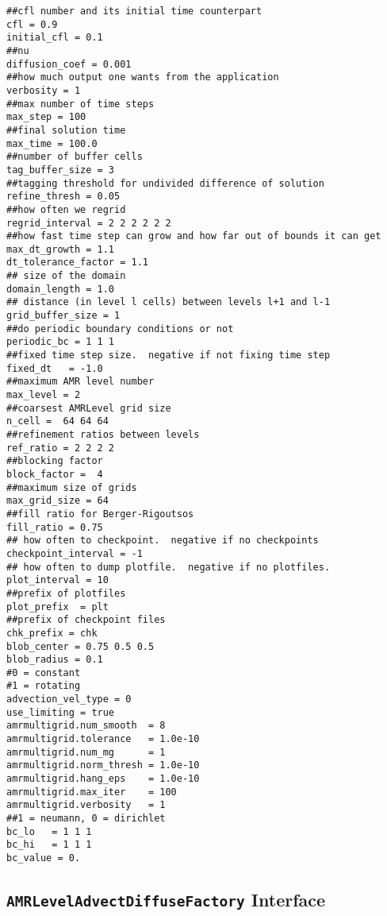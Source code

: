 \begin{small}
\begin{verbatim}
##cfl number and its initial time counterpart
cfl = 0.9
initial_cfl = 0.1
##nu
diffusion_coef = 0.001
##how much output one wants from the application
verbosity = 1
##max number of time steps
max_step = 100
##final solution time
max_time = 100.0
##number of buffer cells
tag_buffer_size = 3
##tagging threshold for undivided difference of solution
refine_thresh = 0.05
##how often we regrid
regrid_interval = 2 2 2 2 2 2
##how fast time step can grow and how far out of bounds it can get
max_dt_growth = 1.1
dt_tolerance_factor = 1.1
## size of the domain
domain_length = 1.0 
## distance (in level l cells) between levels l+1 and l-1
grid_buffer_size = 1
##do periodic boundary conditions or not
periodic_bc = 1 1 1 
##fixed time step size.  negative if not fixing time step
fixed_dt   = -1.0
##maximum AMR level number
max_level = 2
##coarsest AMRLevel grid size
n_cell =  64 64 64
##refinement ratios between levels
ref_ratio = 2 2 2 2 
##blocking factor
block_factor =  4
##maximum size of grids
max_grid_size = 64
##fill ratio for Berger-Rigoutsos
fill_ratio = 0.75
## how often to checkpoint.  negative if no checkpoints
checkpoint_interval = -1
## how often to dump plotfile.  negative if no plotfiles.
plot_interval = 10
##prefix of plotfiles
plot_prefix  = plt
##prefix of checkpoint files
chk_prefix = chk
blob_center = 0.75 0.5 0.5
blob_radius = 0.1
#0 = constant
#1 = rotating
advection_vel_type = 0
use_limiting = true
amrmultigrid.num_smooth  = 8
amrmultigrid.tolerance   = 1.0e-10
amrmultigrid.num_mg      = 1
amrmultigrid.norm_thresh = 1.0e-10
amrmultigrid.hang_eps    = 1.0e-10
amrmultigrid.max_iter    = 100
amrmultigrid.verbosity   = 1
##1 = neumann, 0 = dirichlet
bc_lo   = 1 1 1
bc_hi   = 1 1 1
bc_value = 0.
\end{verbatim}
\end{small}

\subsection{{\tt AMRLevelAdvectDiffuseFactory} Interface}

